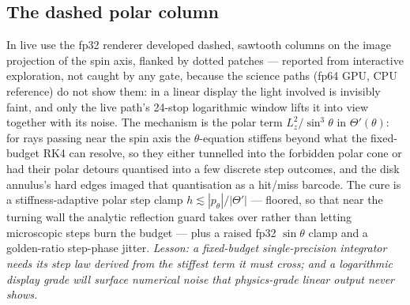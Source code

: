 \subsection{The dashed polar column}
\label{sec:polarcolumn}
In live use the fp32 renderer developed dashed, sawtooth columns on
the image projection of the spin axis, flanked by dotted patches —
reported from interactive exploration, not caught by any gate, because
the science paths (fp64 GPU, CPU reference) do not show them: in a
linear display the light involved is invisibly faint, and only the
live path's 24-stop logarithmic window lifts it into view together
with its noise. The mechanism is the polar term
$L_z^2/\sin^3\theta$ in $\Theta'(\theta)$: for rays passing near the
spin axis the $\theta$-equation stiffens beyond what the fixed-budget
RK4 can resolve, so they either tunnelled into the forbidden
polar cone or had their polar detours quantised into a few discrete
step outcomes, and the disk annulus's hard edges imaged that
quantisation as a hit/miss barcode. The cure is a stiffness-adaptive
polar step clamp $h \lesssim |p_\theta|/|\Theta'|$ — floored, so that
near the turning wall the analytic reflection guard takes over rather
than letting microscopic steps burn the budget — plus a raised fp32
$\sin\theta$ clamp and a golden-ratio step-phase jitter.
\emph{Lesson: a fixed-budget single-precision integrator needs its
step law derived from the stiffest term it must cross; and a
logarithmic display grade will surface numerical noise that
physics-grade linear output never shows.}

